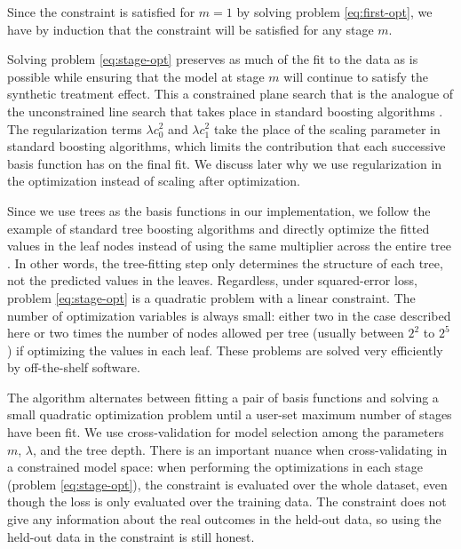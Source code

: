 Since the constraint is satisfied for $m=1$ by solving problem \ref{eq:first-opt}, we have by induction that the constraint will be satisfied for any stage $m$.

Solving problem \ref{eq:stage-opt} preserves as much of the fit to the data as is possible while ensuring that the model at stage $m$ will continue to satisfy the synthetic treatment effect. This a constrained plane search that is the analogue of the unconstrained line search that takes place in standard boosting algorithms \cite{Hastie:2009fg}. The regularization terms $\lambda c_0^2$ and  $\lambda c_1^2$ take the place of the scaling parameter in standard boosting algorithms, which limits the contribution that each successive basis function has on the final fit. We discuss later why we use regularization in the optimization instead of scaling after optimization. %

Since we use trees as the basis functions in our implementation, we follow the example of standard tree boosting algorithms and directly optimize the fitted values in the leaf nodes instead of using the same multiplier across the entire tree \cite{Hastie:2009fg}. In other words, the tree-fitting step only determines the structure of each tree, not the predicted values in the leaves. Regardless, under squared-error loss, problem \ref{eq:stage-opt} is a quadratic problem with a linear constraint. The number of optimization variables is always small: either two in the case described here or two times the number of nodes allowed per tree (usually between $2^2$ to $2^5$ ) if optimizing the values in each leaf. These problems are solved very efficiently by off-the-shelf software.

The algorithm alternates between fitting a pair of basis functions and solving a small quadratic optimization problem until a user-set maximum number of stages have been fit. We use cross-validation for model selection among the parameters $m$, $\lambda$, and the tree depth. There is an important nuance when cross-validating in a constrained model space: when performing the optimizations in each stage (problem \ref{eq:stage-opt}), the constraint is evaluated over the whole dataset, even though the loss is only evaluated over the training data. The constraint does not give any information about the real outcomes in the held-out data, so using the held-out data in the constraint is still honest.

